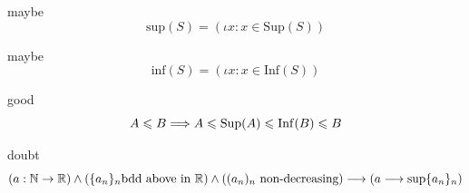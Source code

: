 \begin{definition}maybe
\[
\mbox{sup}(S) = (\iota x: x\in \mathrm{Sup}(S))
\]
\end{definition}
\begin{definition}maybe
\[
\mbox{inf}(S) = (\iota x: x\in \mathrm{Inf}(S))
\]
\end{definition}


\begin{theorem}good
\[
A \leqslant B \Longrightarrow A\leqslant \mathrm{Sup}(A)\leqslant \mathrm{Inf}(B)\leqslant B
\]
\end{theorem}


\begin{theorem}doubt
\[
(a:\mathbb{N}\rightarrow \mathbb{R})
\land
(\{a_n\}_n \mbox{bdd above in }\mathbb{R})
\land
((a_n)_n\mbox{ non-decreasing})
\longrightarrow 
(a \longrightarrow \sup \{a_n\}_n)
\]
\end{theorem}



%

